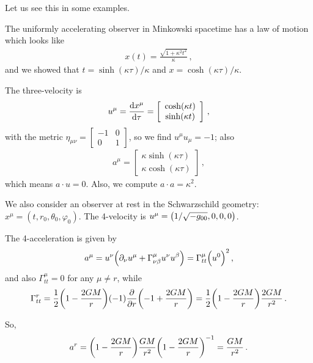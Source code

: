\documentclass[main.tex]{subfiles}
\begin{document}
Let us see this in some examples. 

The uniformly accelerating observer in Minkowski spacetime has a law of motion which looks like 
%
\begin{align}
  x(t) = \frac{\sqrt{1 + \kappa^2 t^2   }}{\kappa }
\,,
\end{align}
%
and we showed that \(t = \sinh (\kappa \tau ) / \kappa \) and \(x = \cosh( \kappa \tau ) / \kappa \). 

The three-velocity is 
%
\begin{align}
  u^{\mu } = \dv{x^{\mu }}{\tau } = \left[\begin{array}{c}
  \cosh(\kappa t) \\ 
  \sinh(\kappa t)
  \end{array}\right]
\,,
\end{align}
%
with the metric \(\eta_{\mu \nu } = \left[\begin{array}{cc}
-1 & 0 \\ 
0 & 1
\end{array}\right]\), so we find \(u^{ \mu } u_{\mu } = -1\); also 
%
\begin{align}
  a^{\mu } = \left[\begin{array}{c}
  \kappa \sinh(\kappa \tau ) \\ 
  \kappa \cosh(\kappa \tau )
  \end{array}\right]
\,,
\end{align}
%
which means \(a \cdot u = 0\). 
Also, we compute \(a \cdot a = \kappa^2\). 

We also consider an observer at rest in the Schwarzschild geometry: \(x^{\mu } = (t, r_0 , \theta_0 , \varphi_0 )\). The 4-velocity is \(u^{\mu } = \qty(1/\sqrt{-g_{00} }, 0, 0, 0)\). 

The 4-acceleration is given by 
%
\begin{align}
  a^{\mu } = u^{\nu } \qty( \partial_{\nu } u^{\mu } + \Gamma^{\mu }_{\nu \beta } u^{\nu } u^{\beta })
  = \Gamma^{\mu }_{tt} \qty(u^{0})^2
\,,
\end{align}
%
and also \(\Gamma^{\mu }_{tt} = 0\) for any \(\mu \neq r\), while 
%
\begin{align}
    \Gamma^{r}_{tt} =  \frac{1}{2} \qty(1 - \frac{2GM}{r}   ) (-1) \pdv{}{r} \qty(-1 + \frac{2GM}{r})
    = \frac{1}{2} \qty(1 - \frac{2GM}{r}) \frac{2GM}{r^2}
\,.
\end{align}

So, 
%
\begin{align}
  a^{r} = \qty(1 - \frac{2GM}{r}) \frac{GM}{r^2} \qty(1 - \frac{2GM}{r})^{-1} = \frac{GM}{r^2}
\,.
\end{align}
\end{document}
